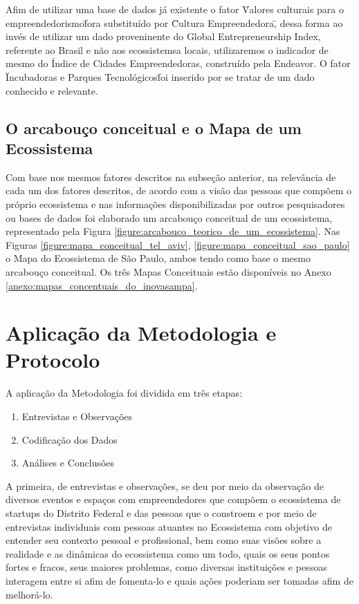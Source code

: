 Afim de utilizar uma base de dados já existente o fator \"Valores culturais para o empreendedorismo\" fora substituído por \"Cultura Empreendedora\", dessa forma ao invés de utilizar um dado proveninente do Global Entrepreneurship Index, referente ao Brasil e não aos ecossistemsa locais, utilizaremos o indicador de mesmo do Índice de Cidades Empreendedoras, construído pela Endeavor. O fator \"Incubadoras e Parques Tecnológicos\" foi inserido por se tratar de um dado conhecido e relevante. 

\subsection{O arcabouço conceitual e o Mapa de um Ecossistema}
\label{subsection:arcabouco_conceitual_e_modelo}

Com base nos mesmos fatores descritos na subseção anterior, na relevância de cada um dos fatores descritos, de acordo com a visão das pessoas que compõem o próprio ecossistema e nas informações disponibilizadas por outros pesquisadores ou bases de dados foi elaborado um arcabouço conceitual de um ecossistema, representado pela Figura \ref{figure:arcabouco_teorico_de_um_ecossistema}. Nas Figuras \ref{figure:mapa_conceitual_tel_aviv}, \ref{figure:mapa_conceitual_sao_paulo} o Mapa do Ecossistema de São Paulo, ambos tendo como base o mesmo arcabouço conceitual. Os três Mapas Conceituais estão disponíveis no Anexo \ref{anexo:mapas_concentuais_do_inovasampa}.

\section{Aplicação da Metodologia e Protocolo}
\label{section:aplicacao_da_metodologia}

A aplicação da Metodologia foi dividida em três etapas:

\begin{enumerate}
  \item Entrevistas e Observações
  \item Codificação dos Dados
  \item Análises e Conclusões
\end{enumerate}

A primeira, de entrevistas e observações, se deu por meio da observação de diversos eventos e espaços com empreendedores que compõem o ecossistema de startups do Distrito Federal e das pessoas que o constroem e por meio de entrevistas individuais com pessoas atuantes no Ecossistema com objetivo de entender seu contexto pessoal e profissional, bem como suas visões sobre a realidade e as dinâmicas do ecossistema como um todo, quais os seus pontos fortes e fracos, seus maiores problemas, como diversas instituições e pessoas interagem entre si afim de fomenta-lo e quais ações poderiam ser tomadas afim de melhorá-lo.

